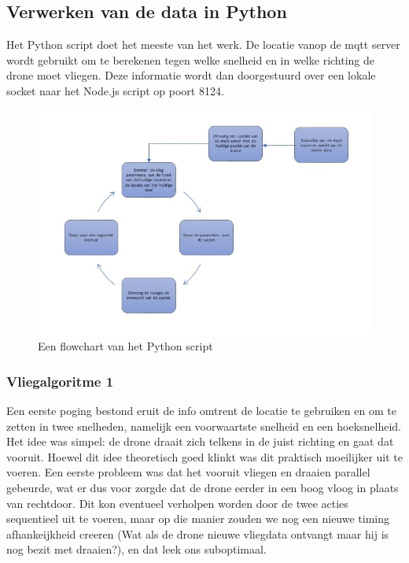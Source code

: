 \subsection{Verwerken van de data in Python}


Het Python script doet het meeste van het werk. De locatie vanop de mqtt server wordt gebruikt om te berekenen tegen welke snelheid en in welke richting de drone moet vliegen. Deze informatie wordt dan doorgestuurd over een lokale socket naar het Node.js script op poort 8124.

\begin{figure}[h]
\caption{Een flowchart van het Python script}
\centering
\includegraphics[width=\textwidth]{images/python_client_flowchart}
\end{figure}

\subsubsection{Vliegalgoritme 1}

Een eerste poging bestond eruit de info omtrent de locatie te gebruiken en om te zetten in twee snelheden, namelijk een voorwaartste snelheid en een hoeksnelheid. Het idee was simpel: de drone draait zich telkens in de juist richting en gaat dat vooruit. Hoewel dit idee theoretisch goed klinkt was dit praktisch moeilijker uit te voeren. Een eerste probleem was dat het vooruit vliegen en draaien parallel gebeurde, wat er dus voor zorgde dat de drone eerder in een boog vloog in plaats van rechtdoor. Dit kon eventueel verholpen worden door de twee acties sequentieel uit te voeren, maar op die manier zouden we nog een nieuwe timing afhankeijkheid creeren (Wat als de drone nieuwe vliegdata ontvangt maar hij is nog bezit met draaien?), en dat leek ons suboptimaal. 

